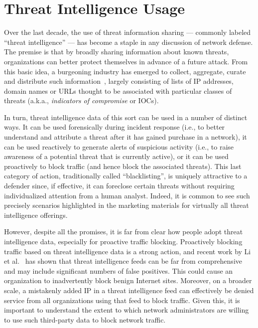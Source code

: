 \chapter{Threat Intelligence Usage}

Over the last decade, the use of threat information sharing ---
commonly labeled ``threat intelligence'' --- has become a staple
in any discussion of network defense.  The premise is that by broadly
sharing information about known threats, organizations can better
protect themselves in advance of a future attack.  From this basic
idea, a burgeoning industry has emerged to collect, aggregate, curate
and distribute such information~\cite{tipredict2018, tounsi2018survey},
largely consisting of lists of IP
addresses, domain names or URLs thought to be associated with
particular classes of threats (a.k.a., \textit{indicators of
  compromise} or IOCs).

In turn, threat intelligence data of this sort can be used in a number
of distinct ways.  It can be used forensically during incident response
(i.e., to better understand and attribute a threat after it has gained
purchase in a network), it can be used reactively to generate alerts
of suspicious activity (i.e., to raise awareness of a potential threat
that is currently active), or it can be used proactively to block
traffic (and hence block the associated threats).  This last category
of action, traditionally called ``blacklisting'', is uniquely
attractive to a defender since, if effective, it can foreclose certain
threats without requiring individualized attention from a human
analyst.  Indeed, it is common to see such precisely scenarios
highlighted in the marketing materials for virtually all threat
intelligence offerings.

However, despite all the promises, it is far from clear how people adopt
threat intelligence data, especially for proactive traffic blocking.
Proactively blocking traffic based on threat intelligence data is a strong
action, and recent work by Li et al.~\cite{li2019reading} has shown that
threat intelligence feeds can be far from comprehensive and may include
significant numbers of false positives. This could cause an organization
to inadvertently block benign Internet sites. Moreover, on a broader scale,
a mistakenly added IP in a threat intelligence feed can
effectively be denied service from all organizations using that feed
to block traffic. Given this, it is important to understand the extent
to which network administrators are willing to use such third-party data to
block network traffic.

